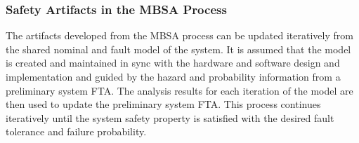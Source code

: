 \subsubsection{Safety Artifacts in the MBSA Process}
The artifacts developed from the MBSA process can be updated iteratively from the shared nominal and fault model of the system. It is assumed that the model is created and maintained in sync with the hardware and software design and implementation and guided by the hazard and probability information from a preliminary system FTA. The analysis results for each iteration of the model are then used to update the preliminary system FTA. This process continues iteratively until the system safety property is satisfied with the desired fault tolerance and failure probability. 



